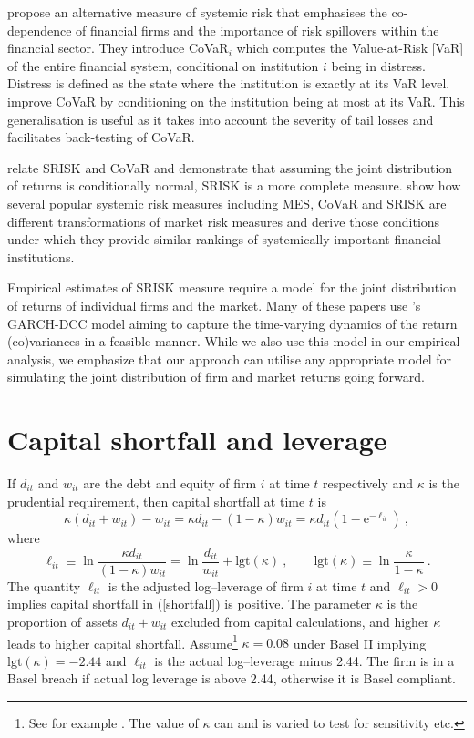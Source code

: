 \documentclass[12pt]{article}
\newcommand{\logit}{\mathrm{lgt}}
\newcommand{\e}{\mathrm{e}}
\newcommand{\eref}[1]{(\ref{#1})}
\newcommand{\cq}{\ , \qquad}
\newcommand{\be}[1]{\begin{equation}\label{#1}}
\newcommand{\ee}{\end{equation}}
\begin{document}
\cite{adrian2011covar} propose an alternative measure of systemic risk that emphasises the co-dependence of financial firms and the importance of risk spillovers within the financial sector. They introduce CoVaR$_i$ which computes the Value-at-Risk [VaR] of the entire financial system, conditional on institution $i$ being in distress. Distress is defined as the state where the institution is exactly at its VaR level. \cite{Girardi2013} improve CoVaR by conditioning on the institution being at most at its VaR. This generalisation is useful as it takes into account the severity of tail losses and facilitates back-testing of CoVaR. 

\cite{acharya2012aer} relate SRISK and CoVaR and demonstrate that assuming the joint distribution of returns is conditionally normal, SRISK is a more complete measure. \cite{Benoit2013} show how several popular systemic risk measures including MES, CoVaR and SRISK are different transformations of market risk measures and derive those conditions under which they provide similar rankings of systemically important financial institutions.

Empirical estimates of SRISK measure require a model for the joint distribution of returns of individual firms and the market. Many of these papers use \cite{engle2002dynamic}'s GARCH-DCC model aiming to capture the time-varying dynamics of the return (co)variances in a feasible manner. While we also use this model in our empirical analysis, we emphasize that our approach can utilise any appropriate model for simulating the joint distribution of firm and market returns going forward. 

\section{Capital shortfall and leverage}\label{capshort}

If $d_{it}$ and $w_{it}$ are the debt and equity of firm $i$ at time $t$ respectively and $\kappa$ is the prudential requirement,  then  capital shortfall at time $t$ is
\be{shortfall}
\kappa(d_{it}+w_{it}) - w_{it} = \kappa d_{it}  - (1-\kappa) w_{it} = \kappa d_{it}\left(1-\e^{-\ell_{it}}\right)\ ,
\ee
where
$$
\ell_{it} \equiv  \ln\frac{\kappa d_{it}}{(1-\kappa)w_{it}}= \ln\frac{d_{it}}{w_{it}}+\logit(\kappa) \cq \logit(\kappa)\equiv \ln \frac{\kappa}{1-\kappa} \ .
$$
The quantity $\ell_{it}$ is the adjusted log--leverage of firm $i$ at time $t$ and $\ell_{it}>0$ implies capital shortfall in \eref{shortfall} is positive. The parameter $\kappa$ is the proportion of assets $d_{it}+w_{it}$ excluded from capital calculations, and higher $\kappa$ leads to higher capital shortfall.
Assume\footnote{See for example \cite{brownlees2015}.   The value of $\kappa$ can and is varied to test for sensitivity etc.} $\kappa=0.08$ under Basel II implying $\logit(\kappa)=-2.44$ and  $\ell_{it}$ is the actual log--leverage minus 2.44.
The firm is in a Basel breach if actual  log leverage is above 2.44, otherwise it is Basel compliant.
\end{document}
